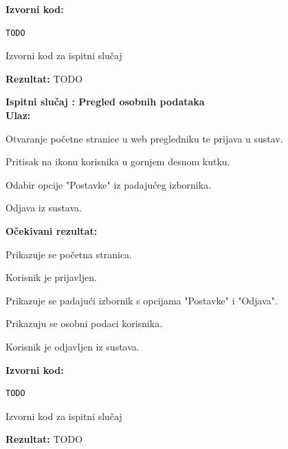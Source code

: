 			\noindent \textbf{Izvorni kod:}

			\begin{listing}[H]
\begin{verbatim}
TODO
\end{verbatim}
				\caption{Izvorni kod za ispitni slučaj \thetestcase}
				\label{test3}
			\end{listing}
			\noindent \textbf{Rezultat:} TODO
			\clearpage

			\noindent \textbf{Ispitni slučaj \thetestcase: Pregled osobnih podataka} \\
			\noindent \textbf{Ulaz:}
			\begin{packed_enum}
				\item Otvaranje početne stranice u web pregledniku te prijava u sustav\footnotemark.
				\item Pritisak na ikonu korisnika u gornjem desnom kutku.
				\item Odabir opcije "Postavke" iz padajućeg izbornika.
				\item Odjava iz sustava\footnotemark[\value{footnote}].

			\end{packed_enum}
			\noindent \textbf{Očekivani rezultat:}
			\begin{packed_enum}
				\item[1.a] Prikazuje se početna stranica.
				\item[1.b] Korisnik je prijavljen.
				\item[2.\ \ ] Prikazuje se padajući izbornik s opcijama "Postavke" i "Odjava".
				\item[3.\ \ ] Prikazuju se osobni podaci korisnika.
				\item[4.\ \ ] Korisnik je odjavljen iz sustava.
			\end{packed_enum}
			\noindent \textbf{Izvorni kod:}

			\begin{listing}[H]
\begin{verbatim}
TODO
\end{verbatim}
				\caption{Izvorni kod za ispitni slučaj \thetestcase}
				\label{test3}
			\end{listing}
			\noindent \textbf{Rezultat:} TODO
			\clearpage

